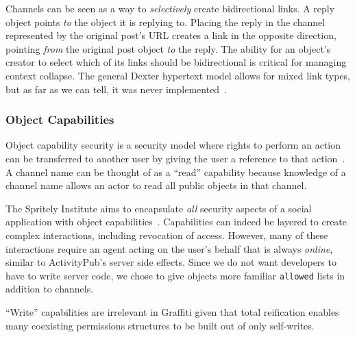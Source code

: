 Channels can be seen as a way to \emph{selectively} create bidirectional links.
A reply object points \emph{to} the object it is replying to.
Placing the reply in the channel represented by the original post's URL
creates a link in the opposite direction,
pointing \emph{from} the original post object \emph{to} the reply.
The ability for an object's creator to select which of its links should be bidirectional
is critical for managing context collapse.
The general Dexter hypertext model allows for mixed link types, but
as far as we can tell, it was never implemented~\cite{dexter}.

\subsubsection{Object Capabilities}
\label{related-work:ocaps}

Object capability security is a security model where rights to perform an action
can be transferred to another user by giving the user a reference to that action~\cite{capabilitymyths}.
A channel name can be thought of as a ``read'' capability because knowledge
of a channel name allows an actor to read all public objects in that channel.

The Spritely Institute aims to encapsulate \emph{all}
security aspects of a social application with object capabilities~\cite{spritely}.
Capabilities can indeed be layered to create complex interactions,
including revocation of access.
However, many of these interactions require an agent acting on the user's behalf
that is always \emph{online}, similar to ActivityPub's server side effects.
Since we do not want developers to have to write server code,
we chose to give objects more familiar \texttt{allowed} lists
in addition to channels.

``Write'' capabilities are irrelevant in Graffiti given that total reification enables many coexisting permissions structures
to be built out of only self-writes.
